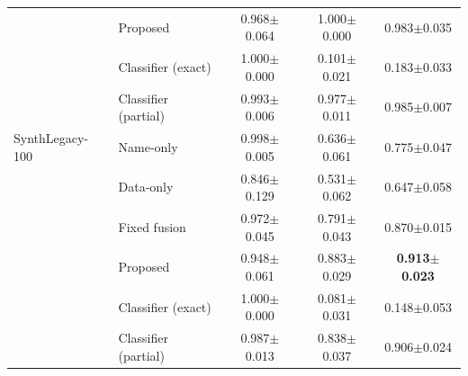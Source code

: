 {\begin{tabular}{llccc}
 & Proposed & 0.968$\pm$0.064 & 1.000$\pm$0.000 & 0.983$\pm$0.035 \\
 & Classifier (exact) & 1.000$\pm$0.000 & 0.101$\pm$0.021 & 0.183$\pm$0.033 \\
 & Classifier (partial) & 0.993$\pm$0.006 & 0.977$\pm$0.011 & 0.985$\pm$0.007 \\
\midrule
SynthLegacy-100 & Name-only & 0.998$\pm$0.005 & 0.636$\pm$0.061 & 0.775$\pm$0.047 \\
 & Data-only & 0.846$\pm$0.129 & 0.531$\pm$0.062 & 0.647$\pm$0.058 \\
 & Fixed fusion & 0.972$\pm$0.045 & 0.791$\pm$0.043 & 0.870$\pm$0.015 \\
 & Proposed & 0.948$\pm$0.061 & 0.883$\pm$0.029 & \textbf{0.913$\pm$0.023} \\
 & Classifier (exact) & 1.000$\pm$0.000 & 0.081$\pm$0.031 & 0.148$\pm$0.053 \\
 & Classifier (partial) & 0.987$\pm$0.013 & 0.838$\pm$0.037 & 0.906$\pm$0.024 \\
\bottomrule
\end{tabular}
}
